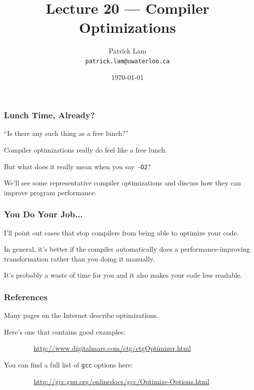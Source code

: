 

\title{Lecture 20 --- Compiler Optimizations }

\author{Patrick Lam \\ \small \texttt{patrick.lam@uwaterloo.ca}}
\date{\today}




\begin{frame}
  \titlepage

\end{frame}

\begin{frame}
\frametitle{Lunch Time, Already?}

``Is there any such thing as a free lunch?''

Compiler optimizations really do feel like a free lunch.


But what does it really mean when you say {\tt -O2}?


We'll see some representative compiler optimizations and discuss how
they can improve program performance. 

\end{frame}

\begin{frame}
\frametitle{You Do Your Job...}

I'll point out cases that stop compilers
from being able to optimize your code. 

In general, it's better if the
compiler automatically does a performance-improving transformation
rather than you doing it manually.

It's probably a waste of time for
you and it also makes your code less readable.

\end{frame}


\begin{frame}
\frametitle{References}

Many pages on the Internet describe
optimizations. 

Here's one that contains good examples:

$\qquad \qquad$ \url{http://www.digitalmars.com/ctg/ctgOptimizer.html}

You can find a full list of {\tt gcc} options here:

$\qquad \qquad$ \url{http://gcc.gnu.org/onlinedocs/gcc/Optimize-Options.html}


\end{frame}

